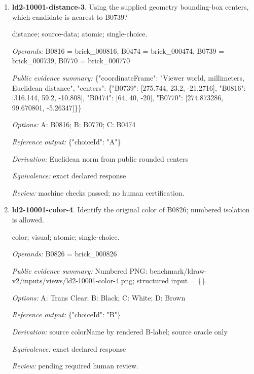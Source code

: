\begin{enumerate}
\par{\small shape-match; visual; atomic; single-choice.\par\textit{Operands:} B0739 = brick\_000739, B0712 = brick\_000712, B0776 = brick\_000776, B0546 = brick\_000546, B0023 = brick\_000023\par\textit{Public evidence summary:} Numbered PNG: benchmark/ldraw-v2/inputs/views/ld2-10001-shape-match-3.png; structured input = \{\}.\par\textit{Options:} A: B0546; B: B0712; C: B0776; D: B0023\par\textit{Reference output:} \{"choiceId": "B"\}\par\textit{Derivation:} source partNumber equality across labeled candidates; source oracle only\par\textit{Equivalence:} same source partNumber; ignore color and pose; perceptual equivalence pending\par\textit{Review:} pending required human review.}
\item \textbf{ld2-10001-distance-3}. Using the supplied geometry bounding-box centers, which candidate is nearest to B0739?
\par{\small distance; source-data; atomic; single-choice.\par\textit{Operands:} B0816 = brick\_000816, B0474 = brick\_000474, B0739 = brick\_000739, B0770 = brick\_000770\par\textit{Public evidence summary:} \{"coordinateFrame": "Viewer world, millimeters, Euclidean distance", "centers": \{"B0739": [275.744, 23.2, -21.2716], "B0816": [316.144, 59.2, -10.808], "B0474": [64, 40, -20], "B0770": [274.873286, 99.670801, -5.26347]\}\}\par\textit{Options:} A: B0816; B: B0770; C: B0474\par\textit{Reference output:} \{"choiceId": "A"\}\par\textit{Derivation:} Euclidean norm from public rounded centers\par\textit{Equivalence:} exact declared response\par\textit{Review:} machine checks passed; no human certification.}
\item \textbf{ld2-10001-color-4}. Identify the original color of B0826; numbered isolation is allowed.
\par{\small color; visual; atomic; single-choice.\par\textit{Operands:} B0826 = brick\_000826\par\textit{Public evidence summary:} Numbered PNG: benchmark/ldraw-v2/inputs/views/ld2-10001-color-4.png; structured input = \{\}.\par\textit{Options:} A: Trans Clear; B: Black; C: White; D: Brown\par\textit{Reference output:} \{"choiceId": "B"\}\par\textit{Derivation:} source colorName by rendered B-label; source oracle only\par\textit{Equivalence:} exact declared response\par\textit{Review:} pending required human review.}

\end{enumerate}
